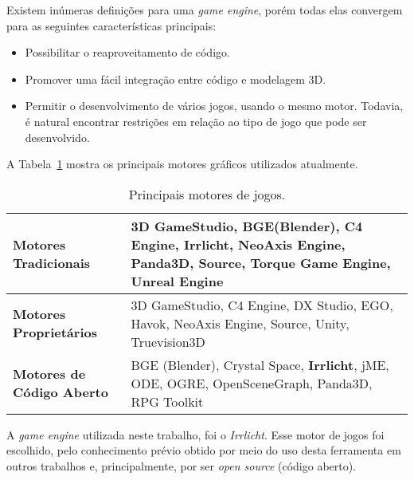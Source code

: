 	Existem inúmeras definições para uma \textit{game engine}, porém todas elas convergem para as seguintes características principais:
\begin{itemize}
	\item Possibilitar o reaproveitamento de código.
	\item Promover uma fácil integração entre código e modelagem 3D.
	\item Permitir o desenvolvimento de  vários jogos, usando o mesmo motor. Todavia, é natural encontrar restrições em relação ao tipo de jogo que pode ser desenvolvido.
\end{itemize}

	A Tabela~\ref{tb:motor} mostra os principais motores gráficos utilizados atualmente.
\begin{table}
\centering
\caption{Principais motores de jogos.}
\begin{tabular}{|p{5cm}|p{9cm}|}
	\hline
	\textbf{Motores Tradicionais} & 3D GameStudio, BGE(Blender), C4 Engine, \textbf{Irrlicht}, NeoAxis Engine, Panda3D, Source, Torque Game Engine, Unreal Engine \\ \hline
	\textbf{Motores Proprietários} & 3D GameStudio, C4 Engine, DX Studio, EGO, Havok, NeoAxis Engine, Source, Unity, Truevision3D  \\ \hline
	\textbf{Motores de Código Aberto} & BGE (Blender), Crystal Space, \textbf{Irrlicht}, jME, ODE, OGRE, OpenSceneGraph, Panda3D, RPG Toolkit\\ 
	\hline
\end{tabular}
\label{tb:motor}
\end{table}

	A \textit{game engine} utilizada neste trabalho, foi o \textit{Irrlicht}. Esse motor de jogos foi escolhido, pelo conhecimento prévio obtido por meio do uso desta ferramenta em outros trabalhos e, principalmente, por ser \textit{open source} (código aberto).
